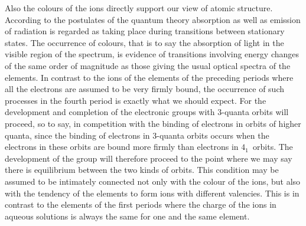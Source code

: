 Also the colours of the ions directly support our view of atomic
structure. According to the postulates of the quantum theory
absorption as well as emission of radiation is regarded as taking
place during transitions between stationary states. The occurrence
of colours, that is to say the absorption of light in the visible region
of the spectrum, is evidence of transitions involving energy changes
of the same order of magnitude as those giving the usual optical
spectra of the elements. In contrast to the ions of the elements of
the preceding periods where all the electrons are assumed to be very
firmly bound, the occurrence of such processes in the fourth period
is exactly what we should expect. For the development and completion
of the electronic groups with $3$-quanta orbits will proceed,
so to say, in competition with the binding of electrons in orbits of
higher quanta, since the binding of electrons in $3$-quanta orbits
occurs when the electrons in these orbits are bound more firmly
than electrons in $4_{1}$~orbits. The development of the group will
therefore proceed to the point where we may say there is equilibrium
between the two kinds of orbits. This condition may be
assumed to be intimately connected not only with the colour of the
ions, but also with the tendency of the elements to form ions with
different valencies. This is in contrast to the elements of the first
periods where the charge of the ions in aqueous solutions is always
the same for one and the same element.

